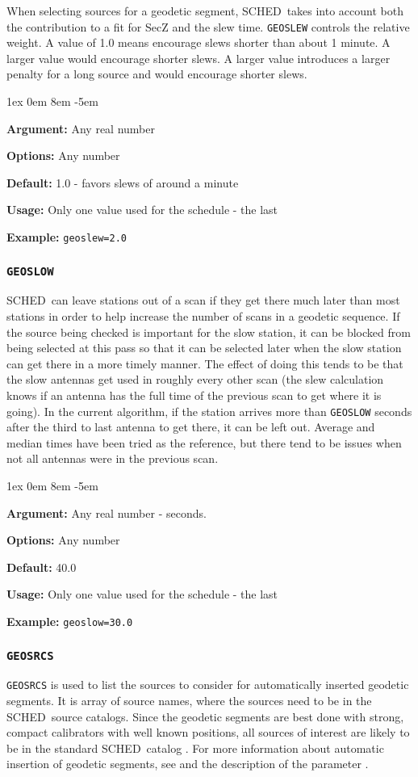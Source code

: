 \documentclass{report}
\newcommand{\schedb}{{\sc SCHED~}}
\newcommand{\rcwbox}[5]{
  \begin{list}{}{\parsep 1ex  \itemsep 0em
                 \leftmargin 8em  \itemindent -5em }
    \item {\bf Argument:} #1
    \item {\bf Options:}  #2
    \item {\bf Default:}  #3
    \item {\bf Usage:}    #4
    \item {\bf Example:}  #5
  \end{list}
}
\begin{document}
When selecting sources for a geodetic segment, \schedb takes into
account both the contribution to a fit for SecZ and the slew time.
{\tt GEOSLEW} controls the relative weight.  A value of 1.0 means
encourage slews shorter than about 1 minute.  A larger value would
encourage shorter slews.  A larger value introduces a larger penalty
for a long source and would encourage shorter slews.

\rcwbox
{Any real number}
{Any number}
{1.0 - favors slews of around a minute}
{Only one value used for the schedule - the last}
{{\tt geoslew=2.0}}


\subsubsection{\label{MP:GEOSLOW}{\tt GEOSLOW}}

\schedb can leave stations out of a scan if they get there much later
than most stations in order to help increase the number of scans in
a geodetic sequence.  If the source being checked is important for
the slow station, it can be blocked from being selected at this pass
so that it can be selected later when the slow station can get there in
a more timely manner.  The effect of doing this tends to be that the
slow antennas get used in roughly every other scan (the slew calculation
knows if an antenna has the full time of the previous scan to get where
it is going).  In the current algorithm, if the station arrives more
than {\tt GEOSLOW} seconds after the third to last antenna to get there,
it can be left out.  Average and median times have been tried as the
reference, but there tend to be issues when not all antennas were in
the previous scan.

\rcwbox
{Any real number - seconds.}
{Any number}
{40.0}
{Only one value used for the schedule - the last}
{{\tt geoslow=30.0}}

\subsubsection{\label{MP:GEOSRCS}{\tt GEOSRCS}}

{\tt GEOSRCS} is used to list the sources to consider for
automatically inserted geodetic segments.  It is array of source
names, where the sources need to be in the \schedb source catalogs.
Since the geodetic segments are best done with strong, compact
calibrators with well known positions, all sources of interest are
likely to be in the standard \schedb catalog .  For more
information about automatic insertion of geodetic segments, see
and the description of the parameter .
\end{document}
